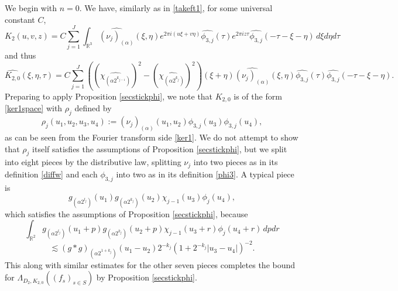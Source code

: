 \documentclass[12pt,reqno]{amsart}
\theoremstyle{plain}
\theoremstyle{definition}
\numberwithin{equation}{section}
\newcommand{\R}{{\mathbb R}}
\begin{document}
We begin with $n=0$.
We have, similarly as in \eqref{takeft1}, for some universal constant $C$,
\[K_2(u,v,z)=C\sum_{j=1}^J \int_{\R^3} \widehat{(\nu_j)_{(\alpha)}}(\xi,\eta)e^{2\pi i (u\xi+v\eta)}\widehat{\phi_{3,j}}(\tau)e^{2\pi i z\tau}\widehat{\phi_{3,j}}(-\tau-\xi-\eta)\, d\xi d\eta d\tau
\]
and thus
\[\widehat{K_{2,0}}(\xi,\eta,\tau)=C\sum_{j=1}^J ((\widehat{\chi_{(\alpha 2^{k_{j-1}})}})^2-(\widehat{\chi_{(\alpha 2^{k_{j}})}})^2)(\xi+\eta)\widehat{(\nu_j)_{(\alpha)}}(\xi,\eta)\widehat{\phi_{3,j}}(\tau)\widehat{\phi_{3,j}}(-\tau-\xi-\eta).
\]
Preparing to apply Proposition \ref{secstickphi}, we note that $K_{2,0}$ is of the form \eqref{ker1space}
with $\rho_j$ defined by
\[{\rho_j}(u_1,u_2,u_3,u_4):=
{(\nu_j)_{(\alpha)}}(u_1,u_2){\phi_{3,j}}(u_3){\phi_{3,j}}(u_4),\]
as can be seen from the Fourier transform side \eqref{ker1}.
We do not attempt to show that $\rho_j$ itself satisfies the assumptions of 
Proposition \ref{secstickphi}, but we split into 
eight
pieces by the distributive law, 
splitting $\nu_j$ into 
two 
pieces as in its definition \eqref{diffw} and each $\phi_{3,j}$ into two
as in its definition \eqref{phi3}. A typical piece is 
\[g_{(\alpha 2^{l_j})}(u_1) g_{(\alpha 2^{k_j})}(u_2)
\chi_{j-1}(u_3)\phi_j(u_4),\]
which satisfies the assumptions of Proposition \ref{secstickphi}, because
\[\int_{\R^2} g_{(\alpha 2^{l_j})}(u_1+p) g_{(\alpha 2^{k_j})}(u_2+p)
\chi_{j-1}(u_3+r)\phi_j(u_4+r)\, dpdr\]
\[\lesssim (g*g)_{(\alpha 2^{1+k_j})}(u_1-u_2) 
2^{-k_j}(1+2^{-k_j}|u_3-u_4|)^{-2}.\]
This along with similar estimates for the other seven pieces completes the bound for $\Lambda_{D_2,K_{2,0}}((f_s)_{s\in S})$ by Proposition \ref{secstickphi}.
\end{document}
